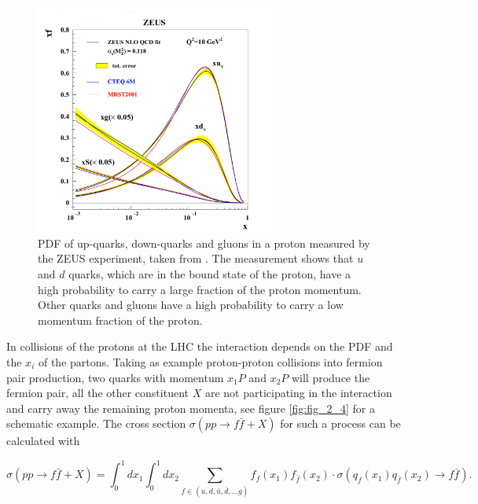 \begin{figure}[ht]
	\centering
	\includegraphics[width=0.7\textwidth]{pictures/ZEUS_PDF.pdf}

	\caption[Proton \gls{PDF} from ZEUS]{\gls{PDF} of up-quarks, down-quarks and gluons in a proton measured by the ZEUS experiment, taken from \cite{PDFMEAS}. The measurement shows that $u$ and $d$ quarks, which are in the bound state of the proton, have a high probability to carry a large fraction of the proton momentum. Other quarks and gluons have a high probability to carry a low momentum fraction of the proton.}
	\label{fig:fig_2_3}
\end{figure}

In collisions of the protons at the \gls{LHC} the interaction depends on the \gls{PDF} and the $x_{i}$ of the partons. Taking as example proton-proton collisions into fermion pair production, two quarks with momentum $x_{1}P$ and $x_{2}P$ will produce the fermion pair, all the other constituent $X$ are not participating in the interaction and carry away the remaining proton momenta, see figure \ref{fig:fig_2_4} for a schematic example. The cross section $\sigma(pp\to f\bar{f} + X)$ \cite{Peskin} for such a process can be calculated with 

\begin{equation}
	\label{eq:eq_2_3}
	\sigma(pp\to f\bar{f} + X) = \int_{0}^{1}dx_{1}\int_{0}^{1}dx_{2}\sum_{f \in (u, d, \bar{u}, \bar{d}, ... g)} f_{f}(x_{1})f_{\bar{f}}(x_{2}) \cdot \sigma(q_{f}(x_{1})q_{\bar{f}}(x_{2}) \to f\bar{f}). 
\end{equation}


